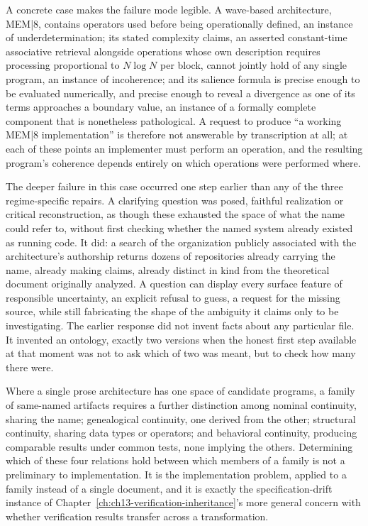 A concrete case makes the failure mode legible. A wave-based architecture, MEM|8, contains operators used before being operationally defined, an instance of underdetermination; its stated complexity claims, an asserted constant-time associative retrieval alongside operations whose own description requires processing proportional to $N \log N$ per block, cannot jointly hold of any single program, an instance of incoherence; and its salience formula is precise enough to be evaluated numerically, and precise enough to reveal a divergence as one of its terms approaches a boundary value, an instance of a formally complete component that is nonetheless pathological. A request to produce ``a working MEM|8 implementation'' is therefore not answerable by transcription at all; at each of these points an implementer must perform an operation, and the resulting program's coherence depends entirely on which operations were performed where.

The deeper failure in this case occurred one step earlier than any of the three regime-specific repairs. A clarifying question was posed, faithful realization or critical reconstruction, as though these exhausted the space of what the name could refer to, without first checking whether the named system already existed as running code. It did: a search of the organization publicly associated with the architecture's authorship returns dozens of repositories already carrying the name, already making claims, already distinct in kind from the theoretical document originally analyzed. A question can display every surface feature of responsible uncertainty, an explicit refusal to guess, a request for the missing source, while still fabricating the shape of the ambiguity it claims only to be investigating. The earlier response did not invent facts about any particular file. It invented an ontology, exactly two versions when the honest first step available at that moment was not to ask which of two was meant, but to check how many there were.

Where a single prose architecture has one space of candidate programs, a family of same-named artifacts requires a further distinction among nominal continuity, sharing the name; genealogical continuity, one derived from the other; structural continuity, sharing data types or operators; and behavioral continuity, producing comparable results under common tests, none implying the others. Determining which of these four relations hold between which members of a family is not a preliminary to implementation. It is the implementation problem, applied to a family instead of a single document, and it is exactly the specification-drift instance of Chapter~\ref{ch:ch13-verification-inheritance}'s more general concern with whether verification results transfer across a transformation.

